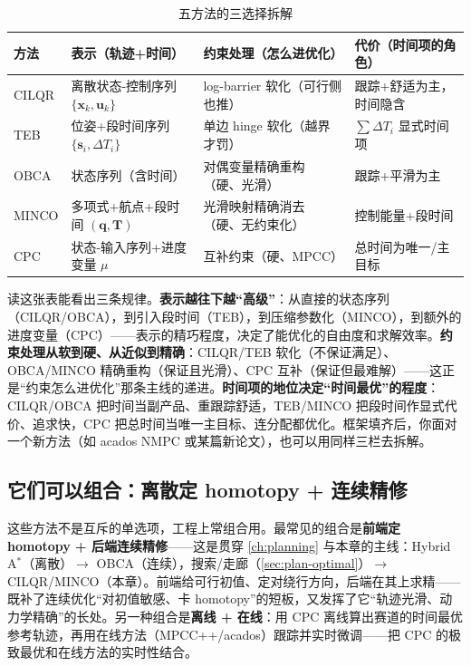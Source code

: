 \begin{table}[H]\centering\small
\caption{五方法的三选择拆解}
\label{tab:st-three-choice}
\begin{tabular}{llll}
\toprule
方法 & 表示（轨迹+时间） & 约束处理（怎么进优化） & 代价（时间项的角色） \\
\midrule
CILQR & 离散状态-控制序列 $\{\mathbf x_k,\mathbf u_k\}$ & log-barrier 软化（可行侧也推） & 跟踪+舒适为主，时间隐含 \\
TEB & 位姿+段时间序列 $\{\mathbf s_i,\Delta T_i\}$ & 单边 hinge 软化（越界才罚） & $\sum\Delta T_i$ 显式时间项 \\
OBCA & 状态序列（含时间） & 对偶变量精确重构（硬、光滑） & 跟踪+平滑为主 \\
MINCO & 多项式+航点+段时间 $(\mathbf q,\mathbf T)$ & 光滑映射精确消去（硬、无约束化） & 控制能量+段时间 \\
CPC & 状态-输入序列+进度变量 $\mu$ & 互补约束（硬、MPCC） & 总时间为唯一/主目标 \\
\bottomrule
\end{tabular}
\end{table}

\noindent 读这张表能看出三条规律。\textbf{表示越往下越“高级”}：从直接的状态序列（CILQR/OBCA），到引入段时间（TEB），到压缩参数化（MINCO），到额外的进度变量（CPC）——表示的精巧程度，决定了能优化的自由度和求解效率。\textbf{约束处理从软到硬、从近似到精确}：CILQR/TEB 软化（不保证满足）、OBCA/MINCO 精确重构（保证且光滑）、CPC 互补（保证但最难解）——这正是“约束怎么进优化”那条主线的递进。\textbf{时间项的地位决定“时间最优”的程度}：CILQR/OBCA 把时间当副产品、重跟踪舒适，TEB/MINCO 把段时间作显式代价、追求快，CPC 把总时间当唯一主目标、连分配都优化。框架填齐后，你面对一个新方法（如 acados NMPC 或某篇新论文），也可以用同样三栏去拆解。

\subsection{它们可以组合：离散定 homotopy + 连续精修}
\label{sec:st-select-combine}

这些方法不是互斥的单选项，工程上常组合用。最常见的组合是\textbf{前端定 homotopy + 后端连续精修}——这是贯穿 \cref{ch:planning} 与本章的主线：Hybrid A$^*$（离散）$\to$ OBCA（连续），搜索/走廊（\cref{sec:plan-optimal}）$\to$ CILQR/MINCO（本章）。前端给可行初值、定对绕行方向，后端在其上求精——既补了连续优化“对初值敏感、卡 homotopy”的短板，又发挥了它“轨迹光滑、动力学精确”的长处。另一种组合是\textbf{离线 + 在线}：用 CPC 离线算出赛道的时间最优参考轨迹，再用在线方法（MPCC++/acados）跟踪并实时微调——把 CPC 的极致最优和在线方法的实时性结合。

